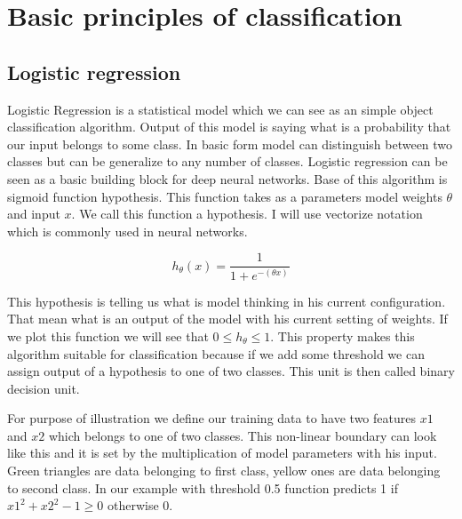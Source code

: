 \chapter{Basic principles of classification}
\section{Logistic regression}
Logistic Regression is a statistical model which we can see as an simple object classification algorithm. Output of this model is saying what is a probability that our input belongs to some class. In basic form model can distinguish between two classes but can be generalize to any number of classes. Logistic regression can be seen as a basic building block for deep neural networks. Base of this algorithm is sigmoid function hypothesis. This function takes as a parameters model weights \(\theta\) and input \(x\). We call this function a hypothesis. I will use vectorize notation which is commonly used in neural networks.

\begin{equation}
\label{hypothesis}
h_\theta (x) = \frac{1}{1+e^{-(\theta x)}}
\end{equation}

This hypothesis is telling us what is model thinking in his current configuration. That mean what is an output of the model with his current setting of weights. If we plot this function we will see that \(0 \leq h_\theta \leq 1\). This property makes this algorithm suitable for classification because if we add some threshold we can assign output of a hypothesis to one of two classes. This unit is then called binary decision unit.

For purpose of illustration we define our training data to have two features \(x1\) and \(x2\) which belongs to one of two classes. This non-linear boundary can look like this and it is set by the multiplication of model parameters with his input. Green triangles are data belonging to first class, yellow ones are data belonging to second class. In our example with threshold 0.5 function predicts 1 if \( x1^2 + x2^2-1 \geq 0 \) otherwise 0.

